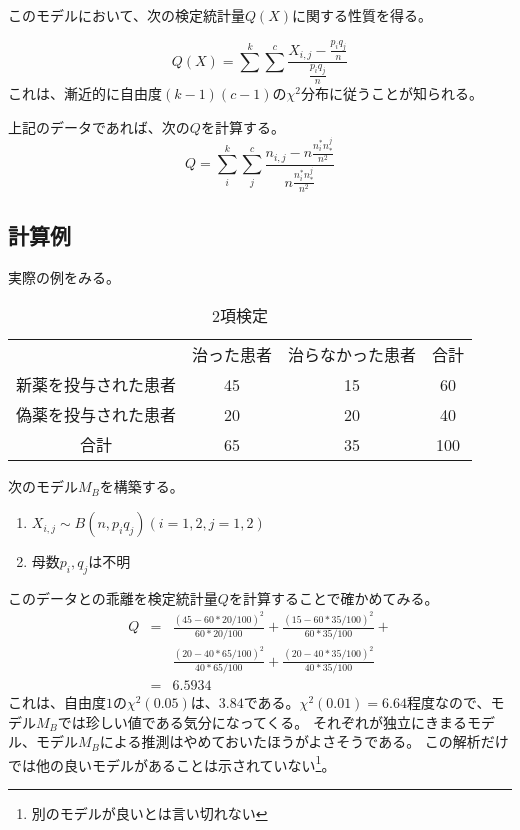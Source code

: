 このモデルにおいて、次の検定統計量$Q(X)$に関する性質を得る。

\begin{equation*}
 Q(X) = \sum^k \sum^c \frac{ X_{i,j} - \frac{p_i q_j}{n}}{\frac{p_i q_j}{n} }
\end{equation*}
これは、漸近的に自由度$(k-1)(c-1)$の$\chi^2$分布に従うことが知られる。

上記のデータであれば、次の$Q$を計算する。
\begin{equation*}
 Q = \sum_i^k \sum_j^c \frac{ n_{i,j} - n\frac{n_i^* n_*^j}{n^2}}{n\frac{n_i^* n_*^j}{n^2} }
\end{equation*}




\subsection{計算例}
実際の例をみる。

\begin{table}[hbtp]
 \caption{2項検定}
\begin{tabular}{c|cc|c}
 & 治った患者 & 治らなかった患者 & 合計 \\
 新薬を投与された患者&45 & 15& 60  \\
 偽薬を投与された患者&20 & 20 & 40 \\
 合計 & 65& 35& 100
\end{tabular}
\end{table}

次のモデル$M_B$を構築する。
\begin{enumerate}
 \item $X_{i,j} \sim B(n,p_i q_j) (i=1,2,j=1,2)$
 \item 母数$p_i,q_j$は不明
\end{enumerate}
このデータとの乖離を検定統計量$Q$を計算することで確かめてみる。
\begin{eqnarray*}
 Q &=& \frac{(45-60*20/100)^2}{60*20/100} +\frac{(15-60*35/100)^2}{60*35/100} + \\
&&\frac{(20-40*65/100)^2}{40*65/100} + 
\frac{(20-40*35/100)^2}{40*35/100} \\
&=& 6.5934
\end{eqnarray*}
これは、自由度$1$の$\chi^2(0.05)$は、$3.84$である。$\chi^2(0.01)=6.64$程度なので、モデル$M_B$では珍しい値である気分になってくる。
それぞれが独立にきまるモデル、モデル$M_B$による推測はやめておいたほうがよさそうである。
この解析だけでは他の良いモデルがあることは示されていない\footnote{別のモデルが良いとは言い切れない}。

